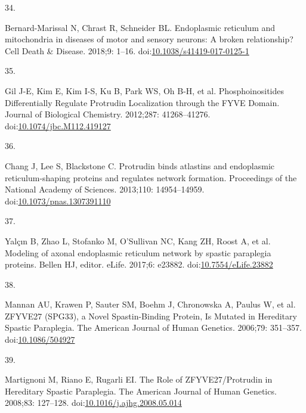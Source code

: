 \documentclass[
  12pt,
  a4paper,
]{book}
\newlength{\cslhangindent}
\newlength{\csllabelwidth}
\newlength{\cslentryspacingunit} %
\newenvironment{CSLReferences}[2] %
 {%
  \setlength{\parindent}{0pt}
  \ifodd #1
  \let\oldpar\par
  \def\par{\hangindent=\cslhangindent\oldpar}
  \fi
  \setlength{\parskip}{#2\cslentryspacingunit}
 }%
 {}
\newcommand{\CSLLeftMargin}[1]{\parbox[t]{\csllabelwidth}{#1}}
\newcommand{\CSLRightInline}[1]{\parbox[t]{\linewidth - \csllabelwidth}{#1}\break}
\begin{document}
\begin{CSLReferences}{0}{0}
\leavevmode{}%
\CSLLeftMargin{34. }%
\CSLRightInline{Bernard-Marissal N, Chrast R, Schneider BL. Endoplasmic reticulum and mitochondria in diseases of motor and sensory neurons: A broken relationship? Cell Death \& Disease. 2018;9: 1--16. doi:\href{https://doi.org/10.1038/s41419-017-0125-1}{10.1038/s41419-017-0125-1}}

\leavevmode{}%
\CSLLeftMargin{35. }%
\CSLRightInline{Gil J-E, Kim E, Kim I-S, Ku B, Park WS, Oh B-H, et al. Phosphoinositides {Differentially Regulate Protrudin Localization} through the {FYVE Domain}. Journal of Biological Chemistry. 2012;287: 41268--41276. doi:\href{https://doi.org/10.1074/jbc.M112.419127}{10.1074/jbc.M112.419127}}

\leavevmode{}%
\CSLLeftMargin{36. }%
\CSLRightInline{Chang J, Lee S, Blackstone C. Protrudin binds atlastins and endoplasmic reticulum-shaping proteins and regulates network formation. Proceedings of the National Academy of Sciences. 2013;110: 14954--14959. doi:\href{https://doi.org/10.1073/pnas.1307391110}{10.1073/pnas.1307391110}}

\leavevmode{}%
\CSLLeftMargin{37. }%
\CSLRightInline{Yalçın B, Zhao L, Stofanko M, O'Sullivan NC, Kang ZH, Roost A, et al. Modeling of axonal endoplasmic reticulum network by spastic paraplegia proteins. Bellen HJ, editor. eLife. 2017;6: e23882. doi:\href{https://doi.org/10.7554/eLife.23882}{10.7554/eLife.23882}}

\leavevmode{}%
\CSLLeftMargin{38. }%
\CSLRightInline{Mannan AU, Krawen P, Sauter SM, Boehm J, Chronowska A, Paulus W, et al. {ZFYVE27} ({SPG33}), a {Novel Spastin-Binding Protein}, {Is Mutated} in {Hereditary Spastic Paraplegia}. The American Journal of Human Genetics. 2006;79: 351--357. doi:\href{https://doi.org/10.1086/504927}{10.1086/504927}}

\leavevmode{}%
\CSLLeftMargin{39. }%
\CSLRightInline{Martignoni M, Riano E, Rugarli EI. The {Role} of {ZFYVE27}/{Protrudin} in {Hereditary Spastic Paraplegia}. The American Journal of Human Genetics. 2008;83: 127--128. doi:\href{https://doi.org/10.1016/j.ajhg.2008.05.014}{10.1016/j.ajhg.2008.05.014}}


\end{CSLReferences}
\end{document}
